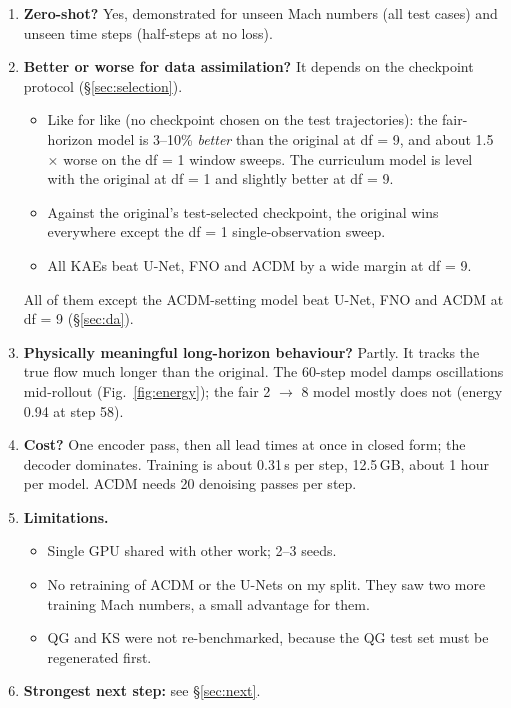 \documentclass[10.5pt,a4paper]{article}
\begin{document}
\begin{enumerate}[leftmargin=*]
\item \textbf{Zero-shot?} Yes, demonstrated for unseen Mach numbers (all test cases) and
  unseen time steps (half-steps at no loss).
\item \textbf{Better or worse for data assimilation?} It depends on the checkpoint protocol
  (\S\ref{sec:selection}).
  \begin{itemize}
  \item Like for like (no checkpoint chosen on the test trajectories): the fair-horizon model
    is 3--10\% \emph{better} than the original at df = 9, and about 1.5$\times$ worse on the
    df = 1 window sweeps. The curriculum model is level with the original at df = 1 and
    slightly better at df = 9.
  \item Against the original's test-selected checkpoint, the original wins everywhere except
    the df = 1 single-observation sweep.
  \item All KAEs beat U-Net, FNO and ACDM by a wide margin at df = 9.
  \end{itemize} All of them except the ACDM-setting model beat U-Net, FNO and ACDM at df = 9
  (\S\ref{sec:da}).
\item \textbf{Physically meaningful long-horizon behaviour?} Partly. It tracks the true flow
  much longer than the original. The 60-step model damps oscillations mid-rollout
  (Fig.~\ref{fig:energy}); the fair 2 $\to$ 8 model mostly does not (energy 0.94 at step 58).
\item \textbf{Cost?} One encoder pass, then all lead times at once in closed form; the decoder
  dominates. Training is about 0.31\,s per step, 12.5\,GB, about 1 hour per model. ACDM needs
  20 denoising passes per step.
\item \textbf{Limitations.}
  \begin{itemize}
  \item Single GPU shared with other work; 2--3 seeds.
  \item No retraining of ACDM or the U-Nets on my split. They saw two more training Mach
    numbers, a small advantage for them.
  \item QG and KS were not re-benchmarked, because the QG test set must be regenerated first.
  \end{itemize}
\item \textbf{Strongest next step:} see \S\ref{sec:next}.
\end{enumerate}
\end{document}
